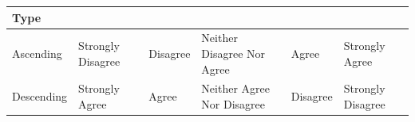 \documentclass[
  english,
]{book}
\begin{document}
\begin{longtable}[]{@{}llllll@{}}
\toprule
\begin{minipage}[b]{0.13\columnwidth}\raggedright
Type\strut
\end{minipage} & \begin{minipage}[b]{0.16\columnwidth}\raggedright
\strut
\end{minipage} & \begin{minipage}[b]{0.13\columnwidth}\raggedright
\strut
\end{minipage} & \begin{minipage}[b]{0.13\columnwidth}\raggedright
\strut
\end{minipage} & \begin{minipage}[b]{0.13\columnwidth}\raggedright
\strut
\end{minipage} & \begin{minipage}[b]{0.14\columnwidth}\raggedright
\strut
\end{minipage}\tabularnewline
\midrule
\endhead
\begin{minipage}[t]{0.13\columnwidth}\raggedright
Ascending\strut
\end{minipage} & \begin{minipage}[t]{0.16\columnwidth}\raggedright
Strongly Disagree\strut
\end{minipage} & \begin{minipage}[t]{0.13\columnwidth}\raggedright
Disagree\strut
\end{minipage} & \begin{minipage}[t]{0.13\columnwidth}\raggedright
Neither Disagree Nor Agree\strut
\end{minipage} & \begin{minipage}[t]{0.13\columnwidth}\raggedright
Agree\strut
\end{minipage} & \begin{minipage}[t]{0.14\columnwidth}\raggedright
Strongly Agree\strut
\end{minipage}\tabularnewline
\begin{minipage}[t]{0.13\columnwidth}\raggedright
Descending\strut
\end{minipage} & \begin{minipage}[t]{0.16\columnwidth}\raggedright
Strongly Agree\strut
\end{minipage} & \begin{minipage}[t]{0.13\columnwidth}\raggedright
Agree\strut
\end{minipage} & \begin{minipage}[t]{0.13\columnwidth}\raggedright
Neither Agree Nor Disagree\strut
\end{minipage} & \begin{minipage}[t]{0.13\columnwidth}\raggedright
Disagree\strut
\end{minipage} & \begin{minipage}[t]{0.14\columnwidth}\raggedright
Strongly Disagree\strut
\end{minipage}\tabularnewline
\bottomrule
\end{longtable}
\end{document}
